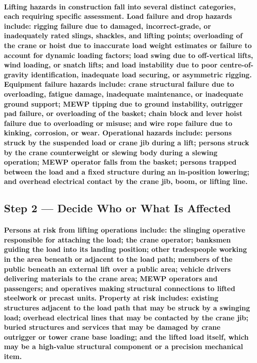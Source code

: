 \paragraph{Lifting hazards in construction fall into several distinct categories, each requiring specific assessment. Load failure and drop hazards include: rigging failure due to damaged, incorrect-grade, or inadequately rated slings, shackles, and lifting points; overloading of the crane or hoist due to inaccurate load weight estimates or failure to account for dynamic loading factors; load swing due to off-vertical lifts, wind loading, or snatch lifts; and load instability due to poor centre-of-gravity identification, inadequate load securing, or asymmetric rigging. Equipment failure hazards include: crane structural failure due to overloading, fatigue damage, inadequate maintenance, or inadequate ground support; MEWP tipping due to ground instability, outrigger pad failure, or overloading of the basket; chain block and lever hoist failure due to overloading or misuse; and wire rope failure due to kinking, corrosion, or wear. Operational hazards include: persons struck by the suspended load or crane jib during a lift; persons struck by the crane counterweight or slewing body during a slewing operation; MEWP operator falls from the basket; persons trapped between the load and a fixed structure during an in-position lowering; and overhead electrical contact by the crane jib, boom, or lifting line.}

\subsection{Step 2 --- Decide Who or What Is Affected}
\paragraph{Persons at risk from lifting operations include: the slinging operative responsible for attaching the load; the crane operator; banksmen guiding the load into its landing position; other tradespeople working in the area beneath or adjacent to the load path; members of the public beneath an external lift over a public area; vehicle drivers delivering materials to the crane area; MEWP operators and passengers; and operatives making structural connections to lifted steelwork or precast units. Property at risk includes: existing structures adjacent to the load path that may be struck by a swinging load; overhead electrical lines that may be contacted by the crane jib; buried structures and services that may be damaged by crane outrigger or tower crane base loading; and the lifted load itself, which may be a high-value structural component or a precision mechanical item.}

